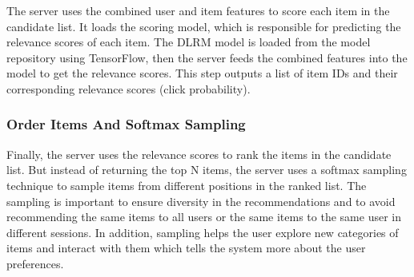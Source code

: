 The server uses the combined user and item features to score each item in the candidate list.
It loads the scoring model, which is responsible for predicting the relevance scores of each item.
The DLRM model is loaded from the model repository using TensorFlow, then the server feeds the combined features into the model to get the relevance scores.
This step outputs a list of item IDs and their corresponding relevance scores (click probability).

\subsubsection{Order Items And Softmax Sampling}

Finally, the server uses the relevance scores to rank the items in the candidate list. 
But instead of returning the top N items, the server uses a softmax sampling technique to sample items from different positions in the ranked list.
The sampling is important to ensure diversity in the recommendations and to avoid recommending the same items to all users or the same items to the same user in different sessions.
In addition, sampling helps the user explore new categories of items and interact with them which tells the system more about the user preferences.
